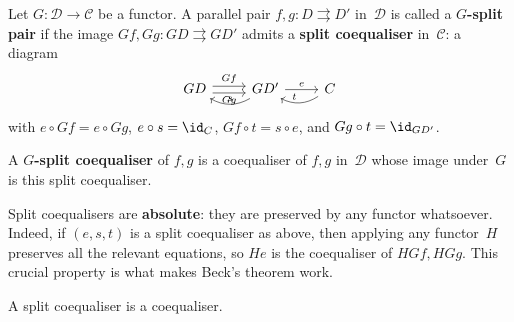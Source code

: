 \begin{definition}\label{def:g-split-coeq}
Let $G\colon\mathcal{D}\to\mathcal{C}$ be a functor.
A parallel pair $f,g\colon D\rightrightarrows D'$ in~$\mathcal{D}$ is
called a \textbf{$G$-split pair} if the image
$Gf,Gg\colon GD\rightrightarrows GD'$ admits a \textbf{split coequaliser}
in~$\mathcal{C}$: a diagram
\[
\begin{tikzcd}
GD \arrow[r, shift left, "Gf"] \arrow[r, shift right, "Gg"'] &
GD' \arrow[r, "e"] \arrow[l, bend left=30, "s"'] &
C \arrow[l, bend left=30, "t"']
\end{tikzcd}
\]
with $e\circ Gf = e\circ Gg$, $e\circ s = \id_C$, $Gf\circ t = s\circ e$,
and $Gg\circ t = \id_{GD'}$.

A \textbf{$G$-split coequaliser} of $f,g$ is a coequaliser of $f,g$
in~$\mathcal{D}$ whose image under~$G$ is this split coequaliser.
\end{definition}

\begin{remark}\label{rem:split-coeq-absolute}
Split coequalisers are \textbf{absolute}: they are preserved by any
functor whatsoever.  Indeed, if $(e,s,t)$ is a split coequaliser as
above, then applying any functor~$H$ preserves all the relevant
equations, so $He$ is the coequaliser of $HGf,HGg$.  This crucial
property is what makes Beck's theorem work.
\end{remark}

\begin{lemma}\label{lem:split-coeq}
A split coequaliser is a coequaliser.
\end{lemma}

